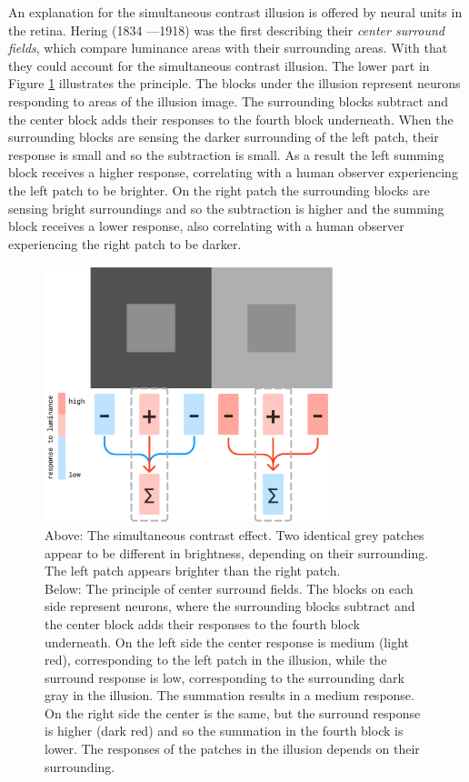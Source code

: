 An explanation for the simultaneous contrast illusion is offered by neural units in the
retina. Hering (1834 —1918) was the first describing their \emph{center surround fields},
which compare luminance areas with their surrounding areas. With that
they could account for the simultaneous contrast illusion. The lower part in Figure
\ref{fig:figure4} illustrates the principle. The blocks under the illusion represent
neurons responding to areas of the illusion image. The surrounding blocks subtract and the
center block adds their responses to the fourth block underneath. When the surrounding
blocks are sensing the darker surrounding of the left patch, their response is small and
so the subtraction is small. As a result the left summing block receives a higher
response, correlating with a human observer experiencing the left patch to be brighter. On
the right patch the surrounding blocks are sensing bright surroundings and so the
subtraction is higher and the summing block receives a lower response, also correlating
with a human observer experiencing the right patch to be darker.


\begin{figure}[H]
    \centering
    \centering
    \includegraphics[width=0.75\textwidth]{media/centre_surround.png}
    \begin{minipage}{0.8\textwidth}
    \caption{Above: The simultaneous contrast effect. Two identical grey patches appear to
    be different in brightness, depending on their surrounding. The left patch appears
    brighter than the right patch. \\ Below: The principle of center surround fields. The
    blocks on each side represent neurons, where the surrounding blocks subtract and the
    center block adds their responses to the fourth block underneath. On the left side the
    center response is medium (light red), corresponding to the left patch in the
    illusion, while the surround response is low, corresponding to the surrounding dark
    gray in the illusion. The summation results in a medium response. On the right side
    the center is the same, but the surround response is higher (dark red) and so the
    summation in the fourth block is lower. The responses of the patches in the illusion
    depends on their surrounding.}
    \label{fig:figure4}
    \end{minipage}
\end{figure}


